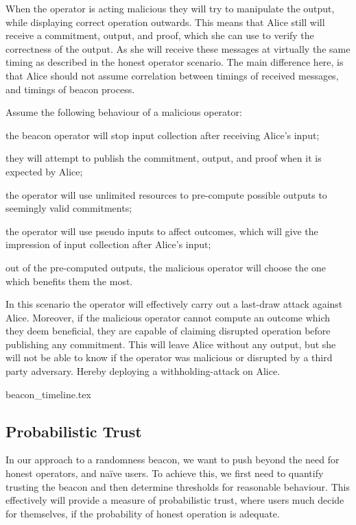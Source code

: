 When the operator is acting malicious they will try to manipulate the output, while displaying correct operation outwards.
This means that Alice still will receive a commitment, output, and proof, which she can use to verify the correctness of the output.
As she will receive these messages at virtually the same timing as described in the honest operator scenario.
The main difference here, is that Alice should not assume correlation between timings of received messages, and timings of beacon process.

Assume the following behaviour of a malicious operator:
\begin{eletterate*}
\item the beacon operator will stop input collection after receiving Alice's input;
\item they will attempt to publish the commitment, output, and proof when it is expected by Alice;
\item the operator will use unlimited resources to pre-compute possible outputs to seemingly valid commitments;
\item the operator will use pseudo inputs to affect outcomes, which will give the impression of input collection after Alice's input;
\item out of the pre-computed outputs, the malicious operator will choose the one which benefits them the most.
\end{eletterate*}

In this scenario the operator will effectively carry out a last-draw attack against Alice.
Moreover, if the malicious operator cannot compute an outcome which they deem beneficial, they are capable of claiming disrupted operation before publishing any commitment.
This will leave Alice without any output, but she will not be able to know if the operator was malicious or disrupted by a third party adversary.
Hereby deploying a withholding-attack on Alice.

{beacon_timeline.tex}

\subsection{Probabilistic Trust}%
\label{sub:probabilistic_trust}
In our approach to a randomness beacon, we want to push beyond the need for honest operators, and naïve users.
To achieve this, we first need to quantify trusting the beacon and then determine thresholds for reasonable behaviour.
This effectively will provide a measure of probabilistic trust, where users much decide for themselves, if the probability of honest operation is adequate.

